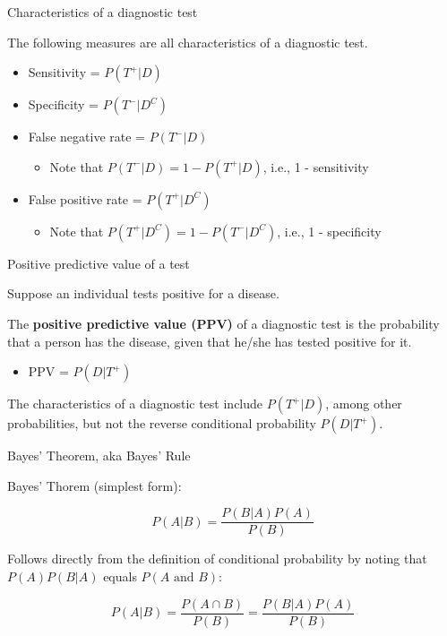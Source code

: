 \documentclass[ignorenonframetext,aspectratio=169]{beamer}
\providecommand{\tightlist}{%
  \setlength{\itemsep}{0pt}\setlength{\parskip}{0pt}}
\begin{document}
\begin{frame}{Characteristics of a diagnostic test}

The following measures are all characteristics of a diagnostic test.

\begin{itemize}
\item
  Sensitivity = \(P (T^+ | D)\)
\item
  Specificity = \(P(T^- | D^C)\)
\item
  False negative rate = \(P(T^- | D)\)

  \begin{itemize}
  \tightlist
  \item
    Note that \(P(T^- | D) = 1 - P (T^+ | D)\), i.e., 1 - sensitivity
  \end{itemize}
\item
  False positive rate = \(P(T^+ | D^C)\)

  \begin{itemize}
  \tightlist
  \item
    Note that \(P(T^+ | D^C) = 1 - P (T^- | D^C)\), i.e., 1 -
    specificity
  \end{itemize}
\end{itemize}

\end{frame}

\begin{frame}{Positive predictive value of a test}

Suppose an individual tests positive for a disease.

The \textbf{positive predictive value (PPV)} of a diagnostic test is the
probability that a person has the disease, given that he/she has tested
positive for it.

\begin{itemize}
\tightlist
\item
  PPV = \(P(D | T^+)\)
\end{itemize}

The characteristics of a diagnostic test include \(P(T^+|D)\), among
other probabilities, but not the reverse conditional probability
\(P(D|T^+)\).

\end{frame}

\begin{frame}{Bayes' Theorem, aka Bayes' Rule}

Bayes' Thorem (simplest form):

\[ P(A|B) = \frac{P(B|A)P(A)}{P(B)}\]

Follows directly from the definition of conditional probability by
noting that \(P(A) P(B|A)\) equals \(P(A \text{ and } B)\):

\[P(A|B) =  \frac{P(A \cap B)}{P(B)} = \frac{P(B|A)P(A)}{P(B)}\]

\end{frame}
\end{document}
